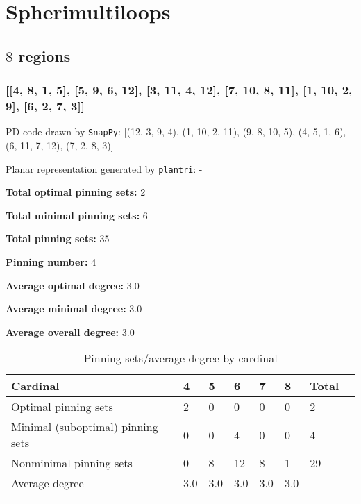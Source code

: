 \documentclass{article}%
\begin{document}
\newpage

\section{Spherimultiloops}
\label{sec:multiloops}

\subsection{$8$ regions}

\subsubsection{[[4, 8, 1, 5], [5, 9, 6, 12], [3, 11, 4, 12], [7, 10, 8, 11], [1, 10, 2, 9], [6, 2, 7, 3]]}

{\small\noindent PD code drawn by \texttt{SnapPy}: [(12, 3, 9, 4), (1, 10, 2, 11), (9, 8, 10, 5), (4, 5, 1, 6), (6, 11, 7, 12), (7, 2, 8, 3)]}

{\small\noindent Planar representation generated by \texttt{plantri}: -}

\begin{multicols}{2}
{\normalsize \noindent\textbf{Total optimal pinning sets:} 2

\noindent\textbf{Total minimal pinning sets:} 6

\noindent\textbf{Total pinning sets:} 35

\noindent\textbf{Pinning number:} 4

}
\columnbreak

{\normalsize \noindent\textbf{Average optimal degree:} 3.0

\noindent\textbf{Average minimal degree:} 3.0

\noindent\textbf{Average overall degree:} 3.0

}
\end{multicols}

\begin{table}[ht]
	\caption{Pinning sets/average degree by cardinal}
	\centering
	\renewcommand{\arraystretch}{1.5}
	\begin{tabularx}{\textwidth}{lXXXXXXX}
		\toprule
			Cardinal & 4 & 5 & 6 & 7 & 8 & Total\\
			\hline
			Optimal pinning sets & 2 & 0 & 0 & 0 & 0 & 2 \\
			Minimal (suboptimal) pinning sets & 0 & 0 & 4 & 0 & 0 & 4 \\
			Nonminimal pinning sets & 0 & 8 & 12 & 8 & 1 & 29 \\
			Average degree & 3.0 & 3.0 & 3.0 & 3.0 & 3.0 &  \\
		\bottomrule \\ 
	\end{tabularx}
\end{table}
\end{document}

